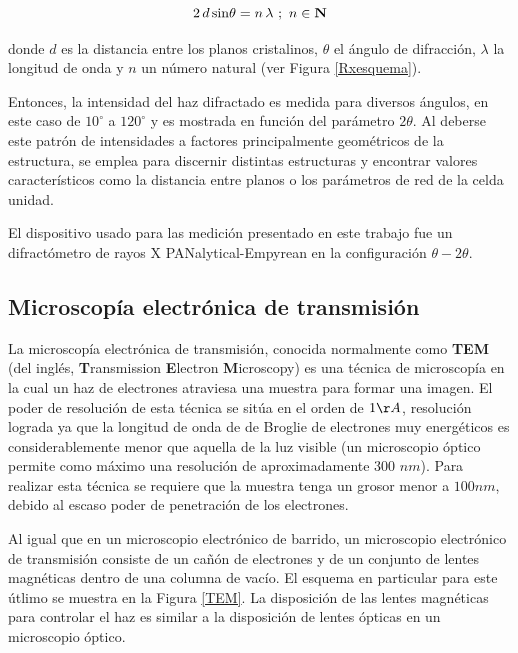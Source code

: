 \documentclass[12pt]{article}
\theoremstyle{definition}
\theoremstyle{remark}
\begin{document}
{\begin{equation}
 2 \, d\, {\rm sin} \theta =n \, \lambda \, \,; \, \, n \in \mathbf{N}
 \end{equation}
 
  \noindent donde $d$ es la distancia entre los planos cristalinos, $\theta$ el ángulo de difracción, $\lambda$ la longitud de onda y $n$ un número natural (ver Figura \ref{Rxesquema}).
 
 Entonces, la intensidad del haz difractado es medida para diversos ángulos, en este caso de $10^{\circ}$ a $120^{\circ}$ y es mostrada en función del parámetro $2\theta$. Al deberse este patrón de intensidades  a factores principalmente geométricos de la estructura, se emplea para discernir distintas estructuras y encontrar valores característicos como la distancia entre planos o los parámetros de red de la celda unidad.

 El dispositivo usado para las medición presentado en este trabajo fue un difractómetro de rayos X PANalytical-Empyrean en la configuración $\theta - 2\theta$.
 
\subsection{Microscopía electrónica de transmisión}
La microscopía electrónica de transmisión, conocida normalmente como \textbf{TEM} (del inglés, \textbf{T}ransmission \textbf{E}lectron \textbf{M}icroscopy) es una técnica de microscopía en la cual un haz de electrones atraviesa una muestra para formar una imagen. El poder de resolución de esta técnica se sitúa en el orden de $1 \AA$, resolución lograda ya que la longitud de onda de de Broglie de electrones muy energéticos es considerablemente menor que aquella de la luz visible (un microscopio óptico permite como máximo una resolución de aproximadamente 300 $nm$). Para realizar esta técnica se requiere que la muestra tenga un grosor menor a $100 nm$, debido al escaso poder de penetración de los electrones.

Al igual que en un microscopio electrónico de barrido, un microscopio electrónico de transmisión consiste de un cañón de electrones y de un conjunto de lentes magnéticas dentro de una columna de vacío. El esquema en particular para este útlimo se muestra en la Figura \ref{TEM}. La disposición de las lentes magnéticas para controlar el haz es similar a la disposición de lentes ópticas en un microscopio óptico.

}
\end{document}
